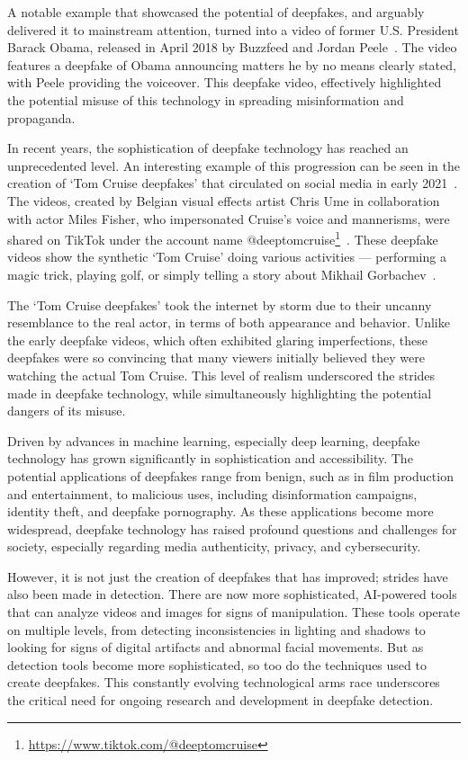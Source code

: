 A notable example that showcased the potential of deepfakes,
and arguably delivered it to mainstream attention, turned into a video of former
U.S. President Barack Obama, released in April 2018 by Buzzfeed and Jordan Peele~\cite{peele,10.1145/3371409}.
The video features a deepfake of Obama announcing matters he by no means clearly
stated, with Peele providing the voiceover. This deepfake video, effectively highlighted
the potential misuse of this technology in spreading misinformation and propaganda.

In recent years, the sophistication of deepfake technology has reached an unprecedented level.
An interesting example of this progression can be seen in the creation of `Tom Cruise deepfakes'
that circulated on social media in early 2021~\cite{deeptomcruise-article}. The videos, created by Belgian visual effects
artist Chris Ume in collaboration with actor Miles Fisher, who impersonated Cruise's voice
and mannerisms, were shared on TikTok under the account name
@deeptomcruise\footnote{\url{https://www.tiktok.com/@deeptomcruise}}~\cite{Agarwal_2021_CVPR,belive-or-not}.
These deepfake videos show the synthetic `Tom Cruise' doing various activities --- performing
a magic trick, playing golf, or simply telling a story about Mikhail Gorbachev~\cite{deeptomcruise}.

The `Tom Cruise deepfakes' took the internet by storm due to their uncanny resemblance to the
real actor, in terms of both appearance and behavior. Unlike the early deepfake videos, which
often exhibited glaring imperfections, these deepfakes were so convincing that many viewers
initially believed they were watching the actual Tom Cruise. This level of realism underscored
the strides made in deepfake technology, while simultaneously highlighting the potential
dangers of its misuse.

Driven by advances in machine learning, especially deep learning, deepfake technology has
grown significantly in sophistication and accessibility. The potential applications of
deepfakes range from benign, such as in film production and entertainment, to malicious uses,
including disinformation campaigns, identity theft, and deepfake pornography. As these
applications become more widespread, deepfake technology has raised profound questions and
challenges for society, especially regarding media authenticity, privacy, and cybersecurity.

However, it is not just the creation of deepfakes that has improved; strides have also been made
in detection. There are now more sophisticated, \ac{AI}-powered tools that can analyze videos
and images for signs of manipulation. These tools operate on multiple levels, from detecting
inconsistencies in lighting and shadows to looking for signs of digital artifacts and abnormal
facial movements. But as detection tools become more sophisticated, so too do the techniques
used to create deepfakes. This constantly evolving technological arms race underscores the
critical need for ongoing research and development in deepfake detection.

